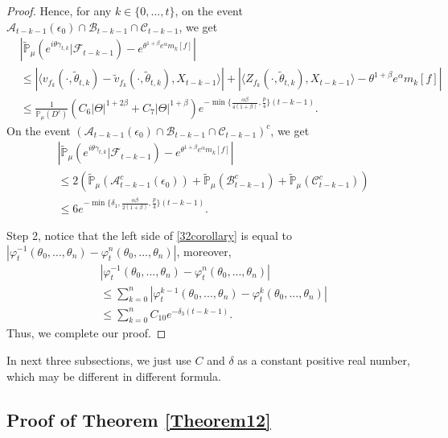 \documentclass[12pt,oneside,english]{amsart}
\theoremstyle{plain}
\theoremstyle{definition}
\numberwithin{equation}{section}
\begin{document}
\begin{proof}
Hence, for any $k\in\{0,...,t\}$, on the event $\mathcal{A}_{t-k-1}(\epsilon_0)\cap\mathcal{B}_{t-k-1}\cap\mathcal{C}_{t-k-1}$, we get
\begin{align*}
   &\left|\mathbb{\tilde{P}}_{\mu}\left(e^{i\theta \gamma_{t,k}}|\mathcal{F}_{t-k-1}\right)-e^{\theta^{1+\beta}e^{\alpha}m_k[f]}\right|\\
   &\leq \left|\langle v_{f_k}(\cdot,\tilde{\theta}_{t,k})-\tilde{v}_{f_k}(\cdot,\tilde{\theta}_{t,k}), X_{t-k-1}\rangle\right|
   +\left|\langle Z_{f_k}(\cdot,\tilde{\theta}_{t,k}),X_{t-k-1}\rangle-\theta^{1+\beta}e^{\alpha}m_k[f]\right|\\
   &\leq \frac{1}{\mathbb{P}_{\mu}(D^c)}(C_6|\Theta|^{1+2\beta}+C_7|\Theta|^{1+\beta}) e^{-\min\{\frac{\alpha\beta}{4(1+\beta)},\frac{p}{4}\}(t-k-1)}.
\end{align*}
On the event $(\mathcal{A}_{t-k-1}(\epsilon_0)\cap\mathcal{B}_{t-k-1}\cap\mathcal{C}_{t-k-1})^c$, we get
\begin{align*}
    &\left|\mathbb{\tilde{P}}_{\mu}\left(e^{i\theta \gamma_{t,k}}|\mathcal{F}_{t-k-1}\right)-e^{\theta^{1+\beta}e^{\alpha}m_k[f]}\right|\\
    &\leq 2(\mathbb{\tilde{P}}_{\mu}(\mathcal{A}^c_{t-k-1}(\epsilon_0))+\mathbb{\tilde{P}}_{\mu}(\mathcal{B}^c_{t-k-1})+\mathbb{\tilde{P}}_{\mu}(\mathcal{C}^c_{t-k-1}))\\
    &\leq 6e^{-\min\{\delta_1,\frac{\alpha\beta}{2(1+\beta)},\frac{p}{4}\}(t-k-1)}.
\end{align*}

Step 2, notice that the left side of \eqref{32corollary} is equal to $\left|\varphi^{-1}_t(\theta_0,...,\theta_n)-\varphi^{n}_t(\theta_0,...,\theta_n)\right|$, moreover,
\begin{align}
    &\left|\varphi^{-1}_t(\theta_0,...,\theta_n)-\varphi^{n}_t(\theta_0,...,\theta_n)\right|
    \\&\leq\sum_{k=0}^n\left|\varphi^{k-1}_t(\theta_0,...,\theta_n)-\varphi^{k}_t(\theta_0,...,\theta_n)\right|
    \\&\leq \sum_{k=0}^n C_{10} e^{-\delta_3(t-k-1)}.
\end{align}
Thus, we complete our proof.
\end{proof}


In next three subsections, we just use $C$ and $\delta$ as a constant positive real number, which may be different in different formula.
\subsection{Proof of Theorem \ref{Theorem12}}
\end{document}
